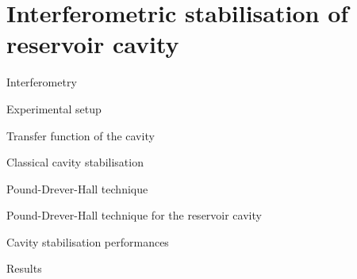 \section{Interferometric stabilisation of reservoir cavity}

\begin{frame}{Interferometry}
	
\end{frame}

\begin{frame}{Experimental setup}
	
\end{frame}

\begin{frame}{Transfer function of the cavity}
	
\end{frame}

\begin{frame}{Classical cavity stabilisation}
	
\end{frame}

\begin{frame}{Pound-Drever-Hall technique}
	
\end{frame}

\begin{frame}{Pound-Drever-Hall technique for the reservoir cavity}

\end{frame}

\begin{frame}{Cavity stabilisation performances}
	
\end{frame}

\begin{frame}{Results}
	
\end{frame}